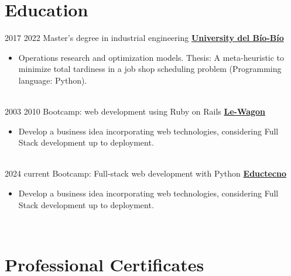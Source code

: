 \documentclass[letterpaper]{DS_class_file} %
\begin{document}
\makeprofile %

\section{Education}

\begin{twenty} %
   	\twentyitem
	    {2017}
		{2022}
	    {\hspace{0.2cm}Master's degree in industrial engineering}
	    {\href{https://magister.industrial.ubiobio.cl/}{\hspace{0.27cm} \textbf{University del Bío-Bío} }}
	    {}
	    {\begin{itemize}
			\item Operations research and optimization models. Thesis: A meta-heuristic to minimize total tardiness in a job shop scheduling problem (Programming language: Python).
		\end{itemize}}
		\\
	   	\twentyitem
			{2003}
			{2010}
			{\hspace{0.2cm}Bootcamp: web development using  Ruby on Rails}
			{\href{https://www.lewagon.com}{\hspace{0.27cm} \textbf{Le-Wagon} }}
			{}
			{\begin{itemize}
					\item Develop a business idea incorporating web technologies, considering Full Stack development up to deployment.
			\end{itemize}}
			\\
			\twentyitem
			{2024}
			{current}
			{\hspace{0.2cm}Bootcamp: Full-stack web development with Python}
			{\href{https://edutecno.cl/}{\hspace{0.27cm} \textbf{Eductecno} }}
			{}
			{\begin{itemize}
					\item Develop a business idea incorporating web technologies, considering Full Stack development up to deployment.
			\end{itemize}}
			\\
\end{twenty}


\section{Professional Certificates}
\end{document}
